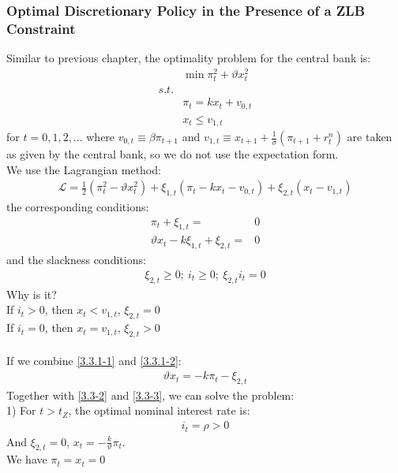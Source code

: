 \documentclass{article}
\numberwithin{equation}{section}
\begin{document}
\subsubsection{Optimal Discretionary Policy in the Presence of a ZLB Constraint}
Similar to previous chapter, the optimality problem for the central bank is:
	\begin{align*}
		&\min \pi^2_t + \vartheta x^2_t\\
		s.t.&\\
		&\pi_t = kx_t + v_{0,t}\\
		&x_t \leq v_{1,t}
	\end{align*}
for $t = 0, 1, 2, \ldots$ where $v_{0,t} \equiv \beta\pi_{t+1}$ and $v_{1,t} \equiv x_{t+1} + \frac{1}{\sigma}(\pi_{t+1} + r^n_t)$ are taken as given by the central bank, so we do not use the expectation form.\\
We use the Lagrangian method:
	\begin{align*}
		\mathscr{L} = \frac{1}{2}(\pi^2_t - \vartheta x^2_t) + \xi_{1,t}(\pi_t - kx_t - v_{0,t}) + \xi_{2,t}(x_t - v_{1,t})
	\end{align*}
the corresponding conditions:
	\begin{align}
		\pi_t + \xi_{1,t} = &0 \label{3.3.1-1}\\
		\vartheta x_t -k\xi_{1,t} + \xi_{2,t} = &0 \label{3.3.1-2}
	\end{align}
and the slackness conditions:
	\begin{align*}
		\xi_{2,t} \geq 0;\ i_t \geq 0;\ \xi_{2,t}i_t = 0
	\end{align*}
Why is it?\\
\indent If $i_t > 0$, then $x_t < v_{1,t}$, $\xi_{2,t} = 0$\\
\indent If $i_t = 0$, then $x_t = v_{1,t}$, $\xi_{2,t} > 0$\\\\
If we combine \eqref{3.3.1-1} and \eqref{3.3.1-2}:
	\begin{align}
		\vartheta x_t = -k\pi_t - \xi_{2,t} \label{3.3.1-3}
	\end{align}
Together with \eqref{3.3-2} and \eqref{3.3-3}, we can solve the problem:\\
1) For $t > t_Z$, the optimal nominal interest rate is:
	\begin{align*}
		i_t = \rho > 0
	\end{align*} 
And $\xi_{2,t} = 0$, $x_t = -\frac{k}{\vartheta}\pi_t$.\\
We have $\pi_t = x_t = 0$\\\\
\end{document}
